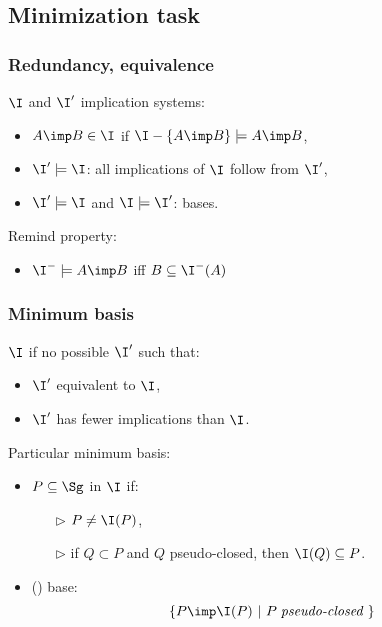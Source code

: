 
\subsection{Minimization task}

\begin{frame}
\frametitle{Redundancy, equivalence}

$\I$ and $\I'$ implication systems:
\begin{itemize}
	\item $A \imp B \in \I$  if $\I - \{A \imp B\} \models A \imp B$,
	\item $\I' \models \I$: all implications of $\I$ follow from $\I'$,
	\item $\I' \models \I$ and $\I \models \I'$:  bases.
\end{itemize}

\vspace{1.2em}

\begin{lightreminder}
	Remind property: 
	\begin{itemize}
		\item $\I^{-} \models A \imp B$ iff $B \subseteq \I^{-}(A)$
	\end{itemize}
\end{lightreminder}

\end{frame}

\begin{frame}
\frametitle{Minimum basis}

$\I$  if no possible $\I'$ such that:
\begin{itemize}
	\item $\I'$ equivalent to $\I$,
	\item $\I'$ has fewer implications than $\I$.
\end{itemize}

\vspace{1.2em}

Particular minimum basis:
\begin{itemize}
	\item $P \subseteq \Sg$  in $\I$ if:
		\begin{itemize}
			\item[\color{belize} $\triangleright$] $P \neq \I(P)$,
			\item[\color{belize} $\triangleright$] if $Q \subset P$ and $Q$ pseudo-closed, then $\I(Q) \subseteq P$.
		\end{itemize}
	\item {} () base:
		\[ \{ P \imp \I(P) \ | \ P \; \textit{pseudo-closed } \} \]
\end{itemize} 



\end{frame}

